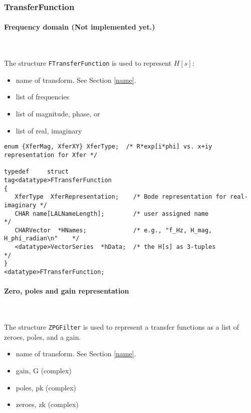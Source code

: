 \documentclass[]{ligodcc}
\renewcommand{\texttt}[1]{{\ttfamily\color{blue}#1}}
\begin{document}
\subsubsection{{\texttt {TransferFunction}}}

\paragraph{Frequency domain   {\bf (Not implemented yet.)} }~


The structure {\tt FTransferFunction} is used to represent $H[s]$:

\begin{itemize}
\vspace{-0.1in}
\item
name of transform.  See Section \ref{name}.
\vspace{-0.1in}
\item
list of frequencies
\vspace{-0.1in}
\item
list of magnitude, phase, or
\vspace{-0.1in}
\item
list of real, imaginary
\end{itemize}


{\footnotesize
\begin{verbatim}
enum {XferMag, XferXY} XferType;  /* R*exp[i*phi] vs. x+iy representation for Xfer */

typedef		struct 			
tag<datatype>FTransferFunction
{
   XferType  XferRepresentation;    /* Bode representation for real-imaginary */
   CHAR name[LALNameLength];        /* user assigned name                     */
   CHARVector  *HNames;             /* e.g., "f_Hz, H_mag, H_phi_radian\n"    */
   <datatype>VectorSeries  *hData;  /* the H[s] as 3-tuples                   */
}
<datatype>FTransferFunction;
\end{verbatim}}

\paragraph{Zero, poles and gain representation }~


The structure {\tt ZPGFilter} is used to represent a transfer functions as a
list of zeroes, poles, and a gain.


\begin{itemize}
\vspace{-0.1in}
\item
name of transform. See Section \ref{name}.
\vspace{-0.1in}
\item
gain, G (complex)
\vspace{-0.1in}
\item
poles, pk (complex)
\vspace{-0.1in}
\item
zeroes, zk (complex)
\end{itemize}
\end{document}
